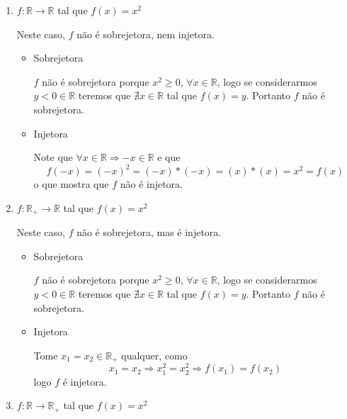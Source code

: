 \begin{exem}

 \begin{enumerate}
  \item $f: \mathbb{R} \rightarrow \mathbb{R}$ tal que $f(x) = x^2$

  Neste caso, $f$ não é sobrejetora, nem injetora.

  \begin{dem}

   \begin{itemize}
    \item Sobrejetora

    $f$ não é sobrejetora porque $x^2 \geq 0$, $\forall x \in \mathbb{R}$, logo se considerarmos $y < 0 \in \mathbb{R}$ teremos que $\nexists x \in \mathbb{R}$ tal que $f(x)= y$. Portanto $f$ não é sobrejetora.
    \fim
    \item Injetora

     Note que $ \forall x \in \mathbb{R} \Rightarrow -x \in \mathbb{R}$ e que
    \[f(-x)= (-x)^2 = (-x)*(-x) = (x)*(x) = x^2 = f(x)\]
    o que mostra que $f$ não é injetora.

   \end{itemize}
  \end{dem}

  \item $f: \mathbb{R_{+}} \rightarrow \mathbb{R}$ tal que $f(x) = x^2$

  Neste caso, $f$ não é sobrejetora, mas é injetora.

  \begin{dem}
   \begin{itemize}
    \item Sobrejetora

    $f$ não é sobrejetora porque $x^2 \geq 0$, $\forall x \in \mathbb{R}$, logo se considerarmos $y < 0 \in \mathbb{R}$ teremos que $\nexists x \in \mathbb{R}$ tal que $f(x)= y$. Portanto $f$ não é sobrejetora.
    \fim
    \item Injetora

    Tome $x_1=x_2 \in \mathbb{R_{+}}$ qualquer, como
    \[x_1=x_2 \Rightarrow x_1^2=x_2^2 \Rightarrow f(x_1)=f(x_2)\]
    logo $f$ é injetora.

   \end{itemize}
  \end{dem}

  \item $f: \mathbb{R} \rightarrow \mathbb{R_{+}}$ tal que $f(x) = x^2$


\end{enumerate}
\end{exem}
